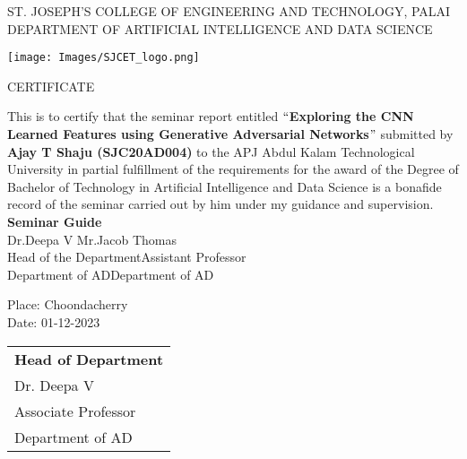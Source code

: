\newpage
\thispagestyle{empty}

\newpage
\thispagestyle{empty}
\begin{center}
\normalsize{ST. JOSEPH’S COLLEGE OF ENGINEERING AND TECHNOLOGY, PALAI}\\[0.5cm]
\normalsize
 { DEPARTMENT OF ARTIFICIAL INTELLIGENCE AND DATA SCIENCE}\\[1.0cm]%
   \begin{center}
   \texttt{[image: Images/SJCET\_logo.png]}
   \end{center}
{\large CERTIFICATE}\\[1.5cm]
\end{center}
\normalsize 
This is to certify that the seminar report entitled {\bf $``$Exploring the CNN Learned Features using Generative Adversarial Networks$"$} submitted by { \bf Ajay T Shaju (SJC20AD004)} to the APJ Abdul Kalam Technological University in partial fulfillment of the requirements for the award of the Degree of Bachelor of Technology in Artificial Intelligence and Data Science is a bonafide record of the seminar carried out by him under my guidance and supervision.\vspace{1.3 cm}\\
{\bf Seminar Guide}\hspace{8.2 cm}{\bf Seminar Coordinator}\\
Dr.Deepa V\hspace{9.0 cm} Mr.Jacob Thomas\\
Head of the Department\hspace{6.85 cm}Assistant Professor\hspace{2.6 cm}\\Department of AD\hspace{7.9 cm}Department of AD
\vspace{1.3 cm}\\
\begin{minipage}[t]{0.5\textwidth}
\begin{flushleft}
\setlength{\leftskip}{0pt} %
\vspace{0.2 cm}
Place: Choondacherry \\
Date: 01-12-2023
\end{flushleft}
\end{minipage}%
\begin{minipage}[t]{0.49\textwidth}
\begin{flushright}
\begin{tabular}{l}
\textbf{Head of Department} \\
Dr. Deepa V \\
Associate Professor \\
Department of AD
\end{tabular}
\end{flushright}
\end{minipage}
                
